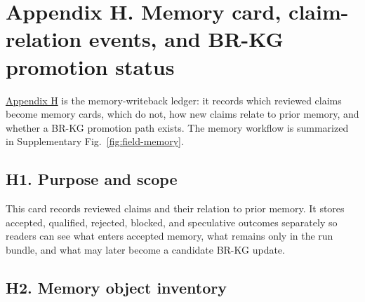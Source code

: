 \section{\texorpdfstring{\textbf{Appendix H. Memory card, claim-relation events, and BR-KG promotion status}}{Appendix H. Memory card, claim-relation events, and BR-KG promotion status}}\label{appendix-h.-memory-card-claim-relation-events-and-br-kg-promotion-status}\label{app:h}

\hyperref[app:h]{Appendix H} is the memory-writeback ledger: it records which reviewed claims become memory cards, which do not, how new claims relate to prior memory, and whether a BR-KG promotion path exists. The memory workflow is summarized in Supplementary Fig.~\ref{fig:field-memory}.

\subsection{\texorpdfstring{\textbf{H1. Purpose and scope}}{H1. Purpose and scope}}\label{h1.-purpose-and-scope}

This card records reviewed claims and their relation to prior memory. It stores accepted, qualified, rejected, blocked, and speculative outcomes separately so readers can see what enters accepted memory, what remains only in the run bundle, and what may later become a candidate BR-KG update.

\subsection{\texorpdfstring{\textbf{H2. Memory object inventory}}{H2. Memory object inventory}}\label{h2.-memory-object-inventory}

